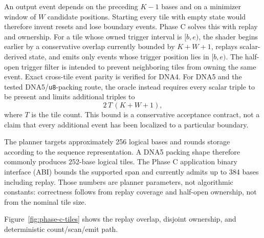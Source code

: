 An output event depends on the preceding $K-1$ bases and on a minimizer window
of $W$ candidate positions.  Starting every tile with empty state would
therefore invent resets and lose boundary events.  Phase C solves this with
replay and ownership. For a tile whose owned trigger interval is $[b,e)$, the
shader begins earlier by a conservative overlap currently bounded by $K+W+1$,
replays scalar-derived state, and emits only events whose trigger position lies
in $[b,e)$. The half-open trigger filter is intended to prevent neighboring
tiles from owning the same event. Exact cross-tile event parity is verified for
DNA4. For DNA5 and the tested DNA5/\texttt{u8}-packing route, the oracle
instead requires every scalar triple to be present and limits additional triples to
\[
  2\,T\,(K+W+1),
\]
where $T$ is the tile count. This bound is a conservative acceptance contract,
not a claim that every additional event has been localized to a particular
boundary.

The planner targets approximately 256 logical bases and rounds storage
according to the sequence representation. A DNA5 packing shape therefore
commonly produces 252-base logical tiles.  The Phase C application binary
interface (ABI) bounds the supported span
and currently admits up to 384 bases including replay.  Those numbers are
planner parameters, not algorithmic constants: correctness follows from
replay coverage and half-open ownership, not from the nominal tile size.

Figure~\ref{fig:phase-c-tiles} shows the replay overlap, disjoint ownership,
and deterministic count/scan/emit path.

